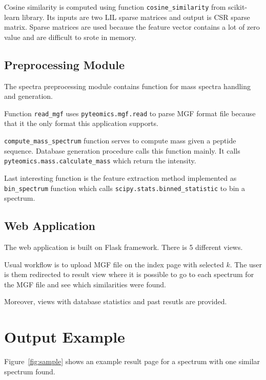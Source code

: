 \documentclass[a4paper,10pt,twocolumn]{article}
\begin{document}
Cosine similarity is computed using function \texttt{cosine\_similarity}
from scikit-learn library. Its inputs are two LIL sparse matrices and output
is CSR sparse matrix. Sparse matrices are used because the feature vector
contains a lot of zero value and are difficult to srote in memory.

\subsection{Preprocessing Module}

The spectra preprocessing module contains function for mass spectra
handling and generation.

Function \texttt{read\_mgf} uses
\texttt{pyteomics.mgf.read} to parse MGF format file because that it the
only format this application supports.

\texttt{compute\_mass\_spectrum} function serves to
compute mass given a peptide sequence.
Database generation procedure calls this function mainly.
It calls \texttt{pyteomics.mass.calculate\_mass} which return the intensity.

Last interesting function is the feature extraction method implemented as
\texttt{bin\_spectrum} function which calls
\texttt{scipy.stats.binned\_statistic} to bin a spectrum.

\subsection{Web Application}

The web application is built on Flask framework. There is 5 different
views.

Usual workflow is to upload MGF file on the index page with
selected \(k\). The user is them redirected to result view where it is
possible to go to each spectrum for the MGF file and see which similarities
were found.

Moreover, views with database statistics and past resutls are provided. 

\section{Output Example}

Figure~\ref{fig:sample} shows an example result page for a spectrum with 
one similar spectrum found.
\end{document}
